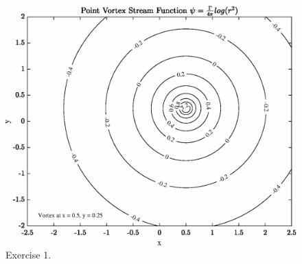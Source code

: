 %

%

\begin{figure}[h]
\centering
\includegraphics[scale=0.8]{Exercise_1_Contourplot.eps}
\caption{Exercise 1.}
\label{foobar-figure}
\end{figure}